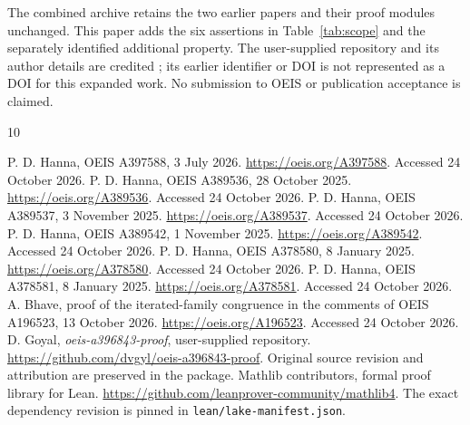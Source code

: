 \documentclass[11pt,a4paper]{article}
\theoremstyle{remark}
\begin{document}
The combined archive retains the two earlier papers and their proof
modules unchanged. This paper adds the six assertions in
Table~\ref{tab:scope} and the separately identified additional property.
The user-supplied repository and its author details are credited
\cite{repo}; its earlier identifier or DOI is not represented as a DOI
for this expanded work. No submission to OEIS or publication acceptance
is claimed.

\begin{thebibliography}{10}
\raggedright
{}
P. D. Hanna, OEIS A397588, 3 July 2026.
\url{https://oeis.org/A397588}. Accessed 24 October 2026.
P. D. Hanna, OEIS A389536, 28 October 2025.
\url{https://oeis.org/A389536}. Accessed 24 October 2026.
P. D. Hanna, OEIS A389537, 3 November 2025.
\url{https://oeis.org/A389537}. Accessed 24 October 2026.
P. D. Hanna, OEIS A389542, 1 November 2025.
\url{https://oeis.org/A389542}. Accessed 24 October 2026.
P. D. Hanna, OEIS A378580, 8 January 2025.
\url{https://oeis.org/A378580}. Accessed 24 October 2026.
P. D. Hanna, OEIS A378581, 8 January 2025.
\url{https://oeis.org/A378581}. Accessed 24 October 2026.
A. Bhave, proof of the iterated-family congruence in the comments
of OEIS A196523, 13 October 2026.
\url{https://oeis.org/A196523}. Accessed 24 October 2026.
D. Goyal, \emph{oeis-a396843-proof}, user-supplied repository.
\url{https://github.com/dvgyl/oeis-a396843-proof}.
Original source revision and attribution are preserved in the package.
Mathlib contributors, formal proof library for Lean.
\url{https://github.com/leanprover-community/mathlib4}.
The exact dependency revision is pinned in
\texttt{lean/lake-manifest.json}.
\end{thebibliography}
\end{document}
